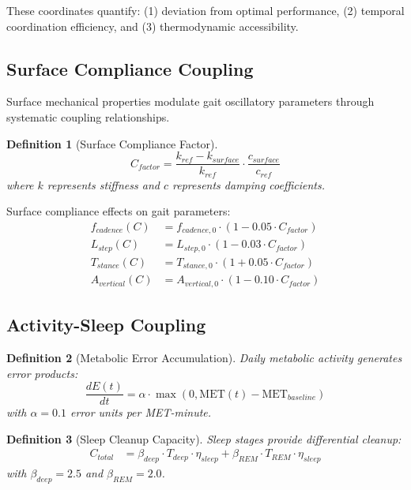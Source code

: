 \documentclass[12pt,twocolumn]{article}
\newtheorem{definition}{Definition}
\begin{document}
These coordinates quantify: (1) deviation from optimal performance, (2) temporal coordination efficiency, and (3) thermodynamic accessibility.

\subsection{Surface Compliance Coupling}

Surface mechanical properties modulate gait oscillatory parameters through systematic coupling relationships.

\begin{definition}[Surface Compliance Factor]
\begin{equation}
C_{factor} = \frac{k_{ref} - k_{surface}}{k_{ref}} \cdot \frac{c_{surface}}{c_{ref}}
\end{equation}
where $k$ represents stiffness and $c$ represents damping coefficients.
\end{definition}

Surface compliance effects on gait parameters:
\begin{align}
f_{cadence}(C) &= f_{cadence,0} \cdot (1 - 0.05 \cdot C_{factor}) \\
L_{step}(C) &= L_{step,0} \cdot (1 - 0.03 \cdot C_{factor}) \\
T_{stance}(C) &= T_{stance,0} \cdot (1 + 0.05 \cdot C_{factor}) \\
A_{vertical}(C) &= A_{vertical,0} \cdot (1 - 0.10 \cdot C_{factor})
\end{align}

\subsection{Activity-Sleep Coupling}

\begin{definition}[Metabolic Error Accumulation]
Daily metabolic activity generates error products:
\begin{equation}
\frac{dE(t)}{dt} = \alpha \cdot \max(0, \text{MET}(t) - \text{MET}_{baseline})
\end{equation}
with $\alpha = 0.1$ error units per MET-minute.
\end{definition}

\begin{definition}[Sleep Cleanup Capacity]
Sleep stages provide differential cleanup:
\begin{align}
C_{total} &= \beta_{deep} \cdot T_{deep} \cdot \eta_{sleep} + \beta_{REM} \cdot T_{REM} \cdot \eta_{sleep}
\end{align}
with $\beta_{deep} = 2.5$ and $\beta_{REM} = 2.0$.
\end{definition}
\end{document}
